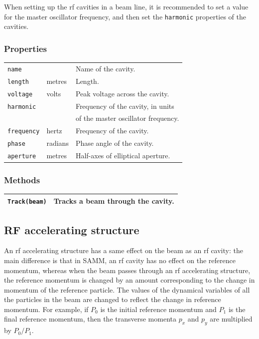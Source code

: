 \documentclass[11pt,twoside,a4paper]{article}
\begin{document}
When setting up the rf cavities in a beam line, it is recommended
to set a value for the master oscillator frequency, and then set the
\texttt{harmonic} properties of the cavities.

\subsubsection{Properties}

\begin{tabular}{|l|l|l|}
\hline
\texttt{name} &              & Name of the cavity.         \\
\texttt{length}            & metres       & Length.                             \\
\texttt{voltage}           & volts        & Peak voltage across the cavity.     \\
\texttt{harmonic}          &              & Frequency of the cavity, in units   \\
                           &              & of the master oscillator frequency. \\
\texttt{frequency} & hertz & Frequency of the cavity. \\
\texttt{phase}             & radians      & Phase angle of the cavity.          \\
\texttt{aperture} & metres & Half-axes of elliptical aperture. \\
\hline
\end{tabular}
\vspace{0.2in}

\subsubsection{Methods}

\begin{tabular}{|l|l|}
\hline
\texttt{Track(beam)} & Tracks a beam through the cavity. \\
\hline
\end{tabular}
\vspace{0.2in}


\subsection{RF accelerating structure\label{sec:rfacceleratingstructure}}
An rf accelerating structure has a same effect on the beam as an rf cavity: the main
difference is that in SAMM, an rf cavity has no effect on the reference momentum,
whereas when the beam passes through an rf accelerating structure, the reference
momentum is changed by an amount corresponding to the change in momentum
of the reference particle.  The values of the dynamical variables of all the particles
in the beam are changed to reflect the change in reference momentum.  For
example, if $P_0$ is the initial reference momentum and $P_1$ is the final reference
momentum, then the transverse momenta $p_x$ and $p_y$ are multiplied by
$P_0/P_1$.
\end{document}
